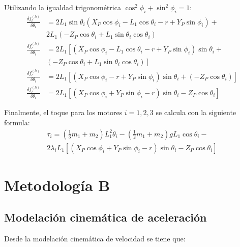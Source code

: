             Utilizando la igualdad trigonométrica $\cos ^{2} \phi _{i}+\sin ^{2} \phi _{i}=1$: 
            \begin{align*}
             \frac{ \delta f_{l}^{ \left( h \right) }}{ \delta  \theta _{i}}&=2L_{1}\sin  \theta _{i} \left( X_{P}\cos  \phi _{i}-L_{1}\cos  \theta _{i}- r+Y_{P}\sin  \phi _{i} \right)+\\
             &2L_{1} \left( -Z_{P}\cos  \theta _{i}+L_{1}\sin  \theta _{i}\cos  \theta _{i} \right)  \\
             \frac{ \delta f_{l}^{ \left( h \right) }}{ \delta  \theta _{i}}&=2L_{1} \left[  \left( X_{P}\cos  \phi _{i}-L_{1}\cos  \theta _{i}- r+Y_{P}\sin  \phi _{i} \right) \sin  \theta _{i}+\right.\\
             &\left.\left( -Z_{P}\cos  \theta _{i}+L_{1}\sin  \theta _{i}\cos  \theta _{i} \right)  \right] \\
             \frac{ \delta f_{l}^{ \left( h \right) }}{ \delta  \theta _{i}}&=2L_{1} \left[  \left( X_{P}\cos  \phi _{i}- r+Y_{P}\sin  \phi _{i} \right) \sin  \theta _{i}+ \left( -Z_{P}\cos  \theta _{i} \right)  \right]  \\
             \frac{ \delta f_{l}^{ \left( h \right) }}{ \delta  \theta _{i}}&=2L_{1} \left[  \left( X_{P}\cos  \phi _{i}+Y_{P}\sin  \phi _{i}- r \right) \sin  \theta _{i}-Z_{P}\cos  \theta _{i} \right]
            \end{align*}
            
         \newpage
            Finalmente, el toque para los motores $i=1,2,3$ se calcula con la siguiente formula:
            \begin{multline}
             \tau_{i}= \left( \frac{1}{3}m_{1}+m_{2} \right) L_{1}^{2}\ddot{ \theta }_{i}- \left( \frac{1}{2}m_{1}+m_{2} \right) gL_{1}\cos  \theta _{i}-\\2 \lambda _{i}L_{1} \left[  \left( X_{P}\cos  \phi _{i}+Y_{P}\sin  \phi _{i}- r \right) \sin  \theta _{i}-Z_{P}\cos  \theta _{i} \right]
            \end{multline}

         \newpage



        
        
        
        
    \section{Metodología B}
        \subsection{Modelación cinemática de aceleración}
        Desde la modelación cinemática de velocidad se tiene que:

